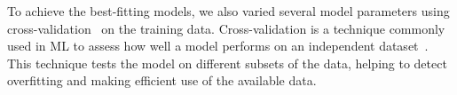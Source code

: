 
To achieve the best-fitting models, we also varied several model parameters using cross-validation~\cite{DBLP:phd/us/Stephenson22} on the training data.
Cross-validation is a technique commonly used in ML to assess how well a model performs on an independent dataset~\cite{DBLP:journals/jsan/AwadF23}.
This technique tests the model on different subsets of the data, helping to detect overfitting and making efficient use of the available data.













